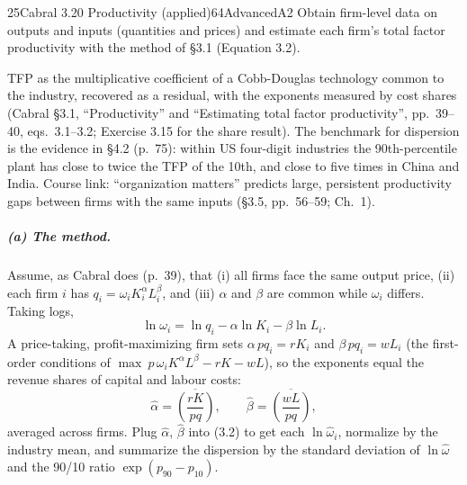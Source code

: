 \begin{exsol}{25}{Cabral 3.20 Productivity (applied)}{64}{Advanced}{A2}
\asked Obtain firm-level data on outputs and inputs (quantities and prices) and estimate each
firm's total factor productivity with the method of \S3.1 (Equation 3.2).

\method TFP as the multiplicative coefficient of a Cobb-Douglas technology common to the
industry, recovered as a residual, with the exponents measured by cost shares (Cabral \S3.1,
``Productivity'' and ``Estimating total factor productivity'', pp.~39--40, eqs.~3.1--3.2;
Exercise 3.15 for the share result). The benchmark for dispersion is the evidence in \S4.2
(p.~75): within US four-digit industries the 90th-percentile plant has close to twice the TFP of
the 10th, and close to five times in China and India. Course link: ``organization matters''
predicts large, persistent productivity gaps between firms with the same inputs (\S3.5,
pp.~56--59; \MR{} Ch.~1).

\solution
\subparagraph{(a) The method.} Assume, as Cabral does (p.~39), that (i) all firms face the same
output price, (ii) each firm $i$ has $q_i = \omega_i K_i^{\alpha} L_i^{\beta}$, and (iii)
$\alpha$ and $\beta$ are common while $\omega_i$ differs. Taking logs,
\[
\ln \omega_i = \ln q_i - \alpha \ln K_i - \beta \ln L_i . \tag{3.2}
\]
A price-taking, profit-maximizing firm sets $\alpha\,p q_i = r K_i$ and $\beta\,p q_i = w L_i$
(the first-order conditions of $\max\ p\,\omega_i K^\alpha L^\beta - rK - wL$), so the exponents
equal the revenue shares of capital and labour costs:
\[
\hat\alpha = \overline{\left(\frac{rK}{pq}\right)}, \qquad
\hat\beta = \overline{\left(\frac{wL}{pq}\right)} ,
\]
averaged across firms. Plug $\hat\alpha$, $\hat\beta$ into (3.2) to get each $\ln\hat\omega_i$,
normalize by the industry mean, and summarize the dispersion by the standard deviation of
$\ln\hat\omega$ and the 90/10 ratio $\exp(p_{90} - p_{10})$.


\end{exsol}
